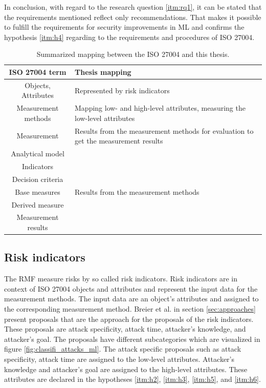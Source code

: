 In conclusion, with regard to the research question \ref{itm:rq1}, it can be stated that the requirements mentioned reflect only recommendations. That makes it possible to fulfill the requirements for security improvements in ML and confirms the hypothesis \ref{itm:h4} regarding to the requirements and procedures of ISO 27004.

\begin{table}[h!]
\centering
  \begin{tabular}{| c | p{10cm} |}
  \hline
  \rowcolor{lightgray} ISO 27004 term & Thesis mapping \\ [0.5ex]
  \hline
  Objects, Attributes & Represented by risk indicators \\
  \hline
  Measurement methods & Mapping low- and high-level attributes, measuring the low-level attributes \\
  \hline
  Measurement & Results from the measurement methods for evaluation to get the measurement results \\
  \hline
  Analytical model & \\
  \hline
  Indicators & \\
  \hline
  Decision criteria & \\
  \hline
  Base measures & Results from the measurement methods \\
  \hline
  Derived measure & \\
  \hline
  Measurement results & \\
  \hline
  \end{tabular}
\caption{Summarized mapping between the ISO 27004 and this thesis.}
\label{tab:iso_table}
\end{table}

\subsection{Risk indicators}
\label{sec:risk_indicators}

The RMF measure risks by so called risk indicators. Risk indicators are in context of ISO 27004 \cite{ISO_27004_2009} objects and attributes and represent the input data for the measurement methods. The input data are an object's attributes and assigned to the corresponding measurement method. Breier et al. \cite{DBLP:journals/corr/abs-2012-04884} in section \ref{sec:approaches} present
proposals that are the approach for the proposals of the risk indicators. These proposals are attack specificity, attack time, attacker's knowledge, and attacker's goal. The proposals have different subcategories which are visualized in figure \ref{fig:classifi_attacks_ml}. The attack specific proposals such as attack specificity, attack time are assigned to the low-level attributes. Attacker's knowledge and attacker's goal are assigned to the high-level attributes. These attributes are declared in the hypotheses \ref{itm:h2}, \ref{itm:h3}, \ref{itm:h5}, and \ref{itm:h6}.

